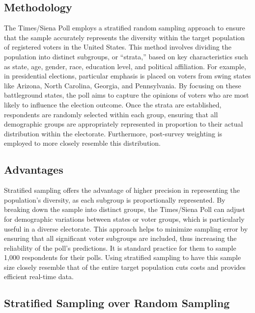 \documentclass[
  letterpaper,
  DIV=11,
  numbers=noendperiod]{scrartcl}
\begin{document}
\hypertarget{methodology}{%
\subsection{Methodology}\label{methodology}}

The Times/Siena Poll employs a stratified random sampling approach to
ensure that the sample accurately represents the diversity within the
target population of registered voters in the United States. This method
involves dividing the population into distinct subgroups, or ``strata,''
based on key characteristics such as state, age, gender, race, education
level, and political affiliation. For example, in presidential
elections, particular emphasis is placed on voters from swing states
like Arizona, North Carolina, Georgia, and Pennsylvania. By focusing on
these battleground states, the poll aims to capture the opinions of
voters who are most likely to influence the election outcome. Once the
strata are established, respondents are randomly selected within each
group, ensuring that all demographic groups are appropriately
represented in proportion to their actual distribution within the
electorate. Furthermore, post-survey weighting is employed to more
closely resemble this distribution.

\hypertarget{advantages}{%
\subsection{Advantages}\label{advantages}}

Stratified sampling offers the advantage of higher precision in
representing the population's diversity, as each subgroup is
proportionally represented. By breaking down the sample into distinct
groups, the Times/Siena Poll can adjust for demographic variations
between states or voter groups, which is particularly useful in a
diverse electorate. This approach helps to minimize sampling error by
ensuring that all significant voter subgroups are included, thus
increasing the reliability of the poll's predictions. It is standard
practice for them to sample 1,000 respondents for their polls. Using
stratified sampling to have this sample size closely resemble that of
the entire target population cuts costs and provides efficient real-time
data.

\hypertarget{stratified-sampling-over-random-sampling}{%
\subsection{Stratified Sampling over Random
Sampling}\label{stratified-sampling-over-random-sampling}}
\end{document}
